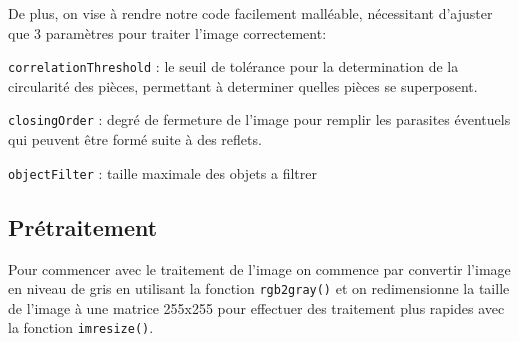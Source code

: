 \documentclass[11pt, openright]{book}
\begin{document}
		De plus, on vise à rendre notre code facilement malléable, nécessitant d'ajuster que 3 paramètres pour traiter l'image correctement:
		\begin{items}[-3pt]{-18pt}{-5pt}
			\item \texttt{correlationThreshold} : le seuil de tolérance pour la determination de la circularité des pièces, permettant à determiner quelles pièces se superposent.
			\item \texttt{closingOrder} : degré de fermeture de l'image pour remplir les parasites éventuels qui peuvent être formé suite à des reflets.
			\item \texttt{objectFilter} : taille maximale des objets a filtrer
		\end{items}
\newpage

		\subsection{Prétraitement}

			Pour commencer avec le traitement de l'image on commence par convertir l'image en niveau de gris en utilisant la fonction \texttt{rgb2gray()} et on redimensionne la taille de l'image à une matrice 255x255 pour effectuer des traitement plus rapides avec la fonction \texttt{imresize()}.
			\begin{figure}[ht!]
				\begin{floatrow}
					

				\end{floatrow}
			\end{figure}
\end{document}

